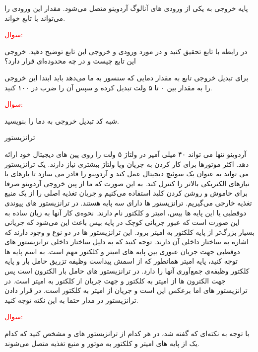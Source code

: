 پایه خروجی  به یکی از ورودی های آنالوگ آردوینو متصل می‌شود. مقدار این ورودی را می‌تواند با تابع  خواند.
\newline
\textcolor{red}{\begin{nas}سوال: \end{nas}}
در رابطه با تابع  تحقیق کنید و در مورد ورودی و خروجی این تابع توضیح دهید. خروجی این تابع چیست و در چه محدوده‌ای قرار دارد؟
\newline

برای تبدیل خروجی تابع  به مقدار دمایی که سنسور به ما می‌دهد باید ابتدا این خروجی را به مقدار بین ۰ تا ۵ ولت تبدیل کرده و سپس آن را ضرب در ۱۰۰ کنید.
\newline
\textcolor{red}{\begin{nas}سوال: \end{nas}}
شبه کد تبدیل خروجی  به دما را بنویسید.

\newline
\begin{nas}ترانزیستور\end{nas}
\newline
آردوینو تنها می تواند ۴۰ میلی آمپر در ولتاژ ۵ ولت را روی پین های دیجیتال خود ارائه دهد. اکثر موتورها برای کار کردن به جریان ویا ولتاژ بیشتری نیاز دارند. یک ترانزیستور می تواند به عنوان یک سوئیچ دیجیتال عمل کند و آردوینو را قادر می سازد تا بارهای با نیازهای الکتریکی بالاتر را کنترل کند. به این صورت که ما از پین خروجی آردوینو صرفا برای خاموش و روشن کردن کلید استفاده می‌کنیم و جریان تغذیه اصلی را از یک منبع تغذیه خارجی می‌گیریم.
\newline
ترانزیستور ها دارای سه پایه هستند. در ترانزیستور های پیوندی دوقطبی یا  این پایه ها بیس، امیتر و کلکتور نام دارند. نحوه‌ی کار آنها به زبان ساده به این صورت است که عبور جریانی کوچک در پایه‌ بیس باعث این می‌شود که جریانی بسیار بزرگ‌تر از پایه کلکتور به امیتر برود. این ترانزیستور ها در دو نوع  و  وجود دارند که اشاره به ساختار داخلی آن دارند.
\newline
توجه کنید که به دلیل ساختار داخلی ترانزیستور های دوقطبی جهت جریان عبوری بین پایه های امیتر و کلکتور مهم است. به اسم پایه ها توجه کنید، پایه امیتر همانطور که از اسمش پیداست وظیفه تزریق حامل بار و پایه کلکتور وظیفه‌ی جمع‌آوری آنها را دارد. در ترانزیستور های  حامل بار الکترون است پس جهت الکترون ها از امیتر به کلکتور و جهت جریان از کلکتور به امیتر است. در ترانزیستور های  اما برعکس این است و جریان از امیتر به کلکتور است.
در قرار دادن ترانزیستور در مدار حتما به این نکته توجه کنید.
\newline
\textcolor{red}{\begin{nas}سوال: \end{nas}}
با توجه به نکته‌ای که گفته شد، در هر کدام از ترانزیستور های  و  مشخص کنید که کدام یک از پایه های امیتر و کلکتور به موتور و منبع تغذیه متصل می‌شوند.

